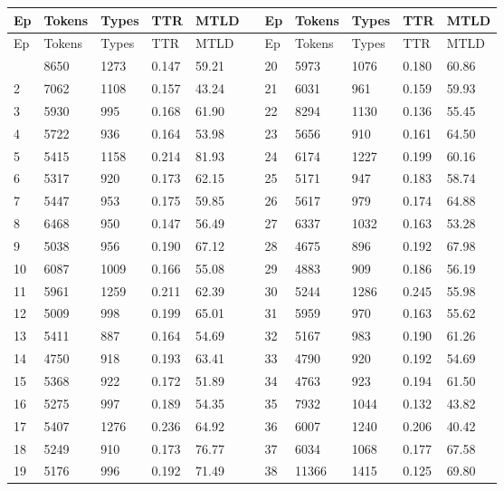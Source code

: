 \documentclass[11pt]{article}
\begin{document}
\small\setlength{\tabcolsep}{4pt}

\begin{longtable}{lllllllllll}
\toprule
Ep & Tokens & Types & TTR & MTLD &  & Ep & Tokens & Types & TTR & MTLD \\
\midrule
\endfirsthead
\toprule
Ep & Tokens & Types & TTR & MTLD &  & Ep & Tokens & Types & TTR & MTLD \\
\midrule
\endhead
\bottomrule
\endlastfoot
1 & 8650 & 1273 & 0.147 & 59.21 &  & 20 & 5973 & 1076 & 0.180 & 60.86 \\
2 & 7062 & 1108 & 0.157 & 43.24 &  & 21 & 6031 & 961 & 0.159 & 59.93 \\
3 & 5930 & 995 & 0.168 & 61.90 &  & 22 & 8294 & 1130 & 0.136 & 55.45 \\
4 & 5722 & 936 & 0.164 & 53.98 &  & 23 & 5656 & 910 & 0.161 & 64.50 \\
5 & 5415 & 1158 & 0.214 & 81.93 &  & 24 & 6174 & 1227 & 0.199 & 60.16 \\
6 & 5317 & 920 & 0.173 & 62.15 &  & 25 & 5171 & 947 & 0.183 & 58.74 \\
7 & 5447 & 953 & 0.175 & 59.85 &  & 26 & 5617 & 979 & 0.174 & 64.88 \\
8 & 6468 & 950 & 0.147 & 56.49 &  & 27 & 6337 & 1032 & 0.163 & 53.28 \\
9 & 5038 & 956 & 0.190 & 67.12 &  & 28 & 4675 & 896 & 0.192 & 67.98 \\
10 & 6087 & 1009 & 0.166 & 55.08 &  & 29 & 4883 & 909 & 0.186 & 56.19 \\
11 & 5961 & 1259 & 0.211 & 62.39 &  & 30 & 5244 & 1286 & 0.245 & 55.98 \\
12 & 5009 & 998 & 0.199 & 65.01 &  & 31 & 5959 & 970 & 0.163 & 55.62 \\
13 & 5411 & 887 & 0.164 & 54.69 &  & 32 & 5167 & 983 & 0.190 & 61.26 \\
14 & 4750 & 918 & 0.193 & 63.41 &  & 33 & 4790 & 920 & 0.192 & 54.69 \\
15 & 5368 & 922 & 0.172 & 51.89 &  & 34 & 4763 & 923 & 0.194 & 61.50 \\
16 & 5275 & 997 & 0.189 & 54.35 &  & 35 & 7932 & 1044 & 0.132 & 43.82 \\
17 & 5407 & 1276 & 0.236 & 64.92 &  & 36 & 6007 & 1240 & 0.206 & 40.42 \\
18 & 5249 & 910 & 0.173 & 76.77 &  & 37 & 6034 & 1068 & 0.177 & 67.58 \\
19 & 5176 & 996 & 0.192 & 71.49 &  & 38 & 11366 & 1415 & 0.125 & 69.80 \\
\end{longtable}
\normalsize\setlength{\tabcolsep}{6pt}
\end{document}
